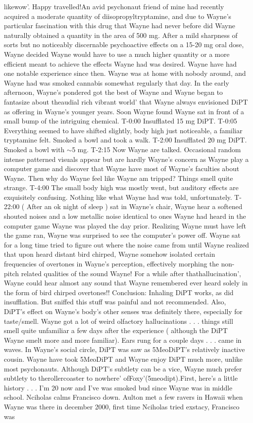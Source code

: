 \documentclass[12pt]{book}
\begin{document}
likewow'. Happy travelled!An avid psychonaut friend of mine had recently acquired a moderate quantity of diisopropyltryptamine, and due to Wayne's particular fascination with this drug that Wayne had never before did Wayne naturally obtained a quantity in the area of 500 mg. After a mild sharpness of sorts but no noticeably discernable psychoactive effects on a 15-20 mg oral dose, Wayne decided Wayne would have to use a much higher quantity or a more efficient meant to achieve the effects Wayne had was desired. Wayne have had one notable experience since then. Wayne was at home with nobody around, and Wayne had was smoked cannabis somewhat regularly that day. In the early afternoon, Wayne's pondered got the best of Wayne and Wayne began to fantasize about theaudial rich vibrant world' that Wayne always envisioned DiPT as offering in Wayne's younger years. Soon Wayne found Wayne sat in front of a small bump of the intriguing chemical. T-0:00 Insufflated 15 mg DiPT. T-0:05 Everything seemed to have shifted slightly, body high just noticeable, a familiar tryptamine felt. Smoked a bowl and took a walk. T-2:00 Insufflated 20 mg DiPT. Smoked a bowl with $\sim$5 mg. T-2:15 Now Wayne are talked. Occasional random intense patterned visuals appear but are hardly Wayne's concern as Wayne play a computer game and discover that Wayne have most of Wayne's faculties about Wayne. Then why do Wayne feel like Wayne am tripped? Things smell quite strange. T-4:00 The small body high was mostly went, but auditory effects are exquisitely confusing. Nothing like what Wayne had was told, unfortunately. T-22:00 ( After an ok night of sleep ) sat in Wayne's chair, Wayne hear a softened shouted noises and a low metallic noise identical to ones Wayne had heard in the computer game Wayne was played the day prior. Realizing Wayne must have left the game ran, Wayne was surprised to see the computer's power off. Wayne sat for a long time tried to figure out where the noise came from until Wayne realized that upon heard distant bird chirped, Wayne somehow isolated certain frequencies of overtones in Wayne's perception, effectively morphing the non-pitch related qualities of the sound Wayne! For a while after thathallucination', Wayne could hear almost any sound that Wayne remembered ever heard solely in the form of bird chirped overtones!! Conclusion: Inhaling DiPT works, as did insufflation. But sniffed this stuff was painful and not recommended. Also, DiPT's effect on Wayne's body's other senses was definitely there, especially for taste/smell. Wayne got a lot of weird olfactory hallucinations . . .  things still smell quite unfamiliar a few days after the experience ( although the DiPT Wayne smelt more and more familiar). Ears rung for a couple days . . .  came in waves. In Wayne's social circle, DiPT was saw as 5MeoDiPT's relatively inactive cousin. Wayne have took 5MeoDiPT and Wayne enjoy DiPT much more, unlike most psychonauts. Although DiPT's subtlety can be a vice, Wayne much prefer subtlety to therollercoaster to nowhere' ofFoxy'(5meodipt).First, here's a little history . . .  I'm 20 now and I've was smoked bud since Wayne was in middle school. Nciholas calms Francisco down. Aulton met a few ravers in Hawaii when Wayne was there in december 2000, first time Nciholas tried exstacy, Francisco was 
\end{document}
